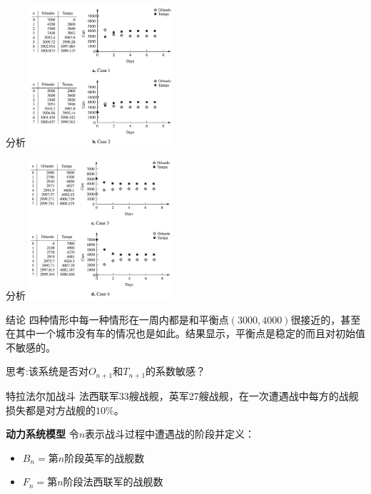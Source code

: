 \documentclass[
  ignorenonframetext,
]{ctexbeamer}
\providecommand{\tightlist}{%
  \setlength{\itemsep}{0pt}\setlength{\parskip}{0pt}}\usepackage{longtable,booktabs,array}
\begin{document}
\begin{frame}{分析}
\label{ux5206ux6790}
\includegraphics[width=0.4\textwidth,height=\textheight]{taxi-case12.png}
\end{frame}

\begin{frame}{分析}
\label{ux5206ux6790-1}
\includegraphics[width=0.4\textwidth,height=\textheight]{taxi-case34.png}
\end{frame}

\begin{frame}{结论}
\label{ux7ed3ux8bba}
四种情形中每一种情形在一周内都是和平衡点\((3000,4000)\)很接近的，甚至在其中一个城市没有车的情况也是如此。结果显示，平衡点是稳定的而且对初始值不敏感的。

思考:该系统是否对\(O_{n+1}\)和\(T_{n+1}\)的系数敏感？
\end{frame}

\begin{frame}{特拉法尔加战斗}
\label{ux7279ux62c9ux6cd5ux5c14ux52a0ux6218ux6597}
法西联军33艘战舰，英军27艘战舰，在一次遭遇战中每方的战舰损失都是对方战舰的\(10\%\)。

\textbf{动力系统模型} 令\(n\)表示战斗过程中遭遇战的阶段并定义：

\begin{itemize}
\tightlist
\item
  \(B_n =\)第\(n\)阶段英军的战舰数
\item
  \(F_n =\)第\(n\)阶段法西联军的战舰数
\end{itemize}
\end{frame}
\end{document}
